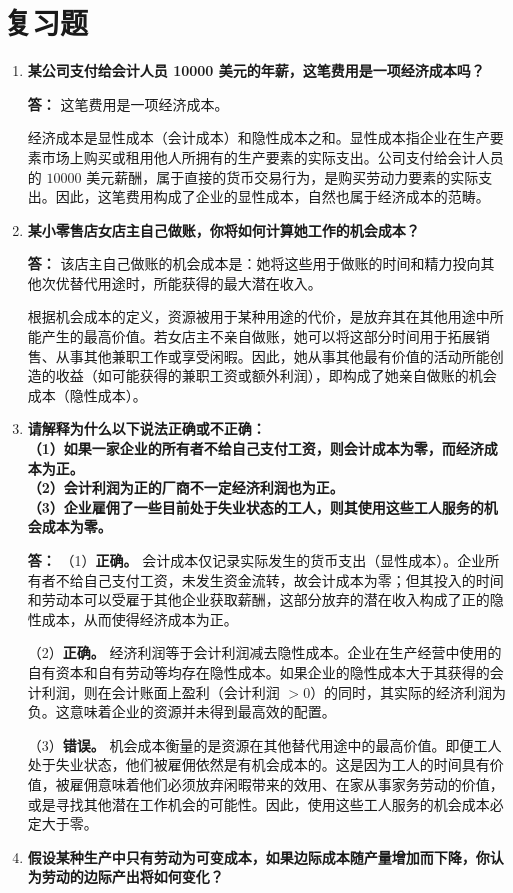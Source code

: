 	\section{复习题}
	\begin{enumerate}[label=\textbf{\arabic*.}, leftmargin=*]
		\item \textbf{某公司支付给会计人员 10000 美元的年薪，这笔费用是一项经济成本吗？}
		
		\textbf{答：}
		这笔费用是一项经济成本。
		
		经济成本是显性成本（会计成本）和隐性成本之和。显性成本指企业在生产要素市场上购买或租用他人所拥有的生产要素的实际支出。公司支付给会计人员的 $10000$ 美元薪酬，属于直接的货币交易行为，是购买劳动力要素的实际支出。因此，这笔费用构成了企业的显性成本，自然也属于经济成本的范畴。
		
		\item \textbf{某小零售店女店主自己做账，你将如何计算她工作的机会成本？}
		
		\textbf{答：}
		该店主自己做账的机会成本是：她将这些用于做账的时间和精力投向其他次优替代用途时，所能获得的最大潜在收入。
		
		根据机会成本的定义，资源被用于某种用途的代价，是放弃其在其他用途中所能产生的最高价值。若女店主不亲自做账，她可以将这部分时间用于拓展销售、从事其他兼职工作或享受闲暇。因此，她从事其他最有价值的活动所能创造的收益（如可能获得的兼职工资或额外利润），即构成了她亲自做账的机会成本（隐性成本）。
		
		\item \textbf{请解释为什么以下说法正确或不正确：\\（1）如果一家企业的所有者不给自己支付工资，则会计成本为零，而经济成本为正。\\（2）会计利润为正的厂商不一定经济利润也为正。\\（3）企业雇佣了一些目前处于失业状态的工人，则其使用这些工人服务的机会成本为零。}
		
		\textbf{答：}
		（1）\textbf{正确。} 会计成本仅记录实际发生的货币支出（显性成本）。企业所有者不给自己支付工资，未发生资金流转，故会计成本为零；但其投入的时间和劳动本可以受雇于其他企业获取薪酬，这部分放弃的潜在收入构成了正的隐性成本，从而使得经济成本为正。
		
		（2）\textbf{正确。} 经济利润等于会计利润减去隐性成本。企业在生产经营中使用的自有资本和自有劳动等均存在隐性成本。如果企业的隐性成本大于其获得的会计利润，则在会计账面上盈利（会计利润 $> 0$）的同时，其实际的经济利润为负。这意味着企业的资源并未得到最高效的配置。
		
		（3）\textbf{错误。} 机会成本衡量的是资源在其他替代用途中的最高价值。即便工人处于失业状态，他们被雇佣依然是有机会成本的。这是因为工人的时间具有价值，被雇佣意味着他们必须放弃闲暇带来的效用、在家从事家务劳动的价值，或是寻找其他潜在工作机会的可能性。因此，使用这些工人服务的机会成本必定大于零。
		\newpage
		\item \textbf{假设某种生产中只有劳动为可变成本，如果边际成本随产量增加而下降，你认为劳动的边际产出将如何变化？}
		

\end{enumerate}
